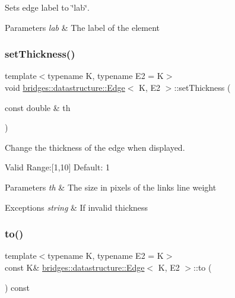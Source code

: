 Sets edge label to \char`\"{}lab\char`\"{}. 


\begin{DoxyParams}{Parameters}
{\em lab} & The label of the element \\
\hline
\end{DoxyParams}
\mbox{\label{classbridges_1_1datastructure_1_1_edge_adf4a6a3974e1fc60331f4b9d33c7b0e5}} 
\subsubsection{\texorpdfstring{set\+Thickness()}{setThickness()}}
{\footnotesize\ttfamily template$<$typename K, typename E2 = K$>$ \\
void \hyperlink{classbridges_1_1datastructure_1_1_edge}{bridges\+::datastructure\+::\+Edge}$<$ K, E2 $>$\+::set\+Thickness (\begin{DoxyParamCaption}\item[{const double \&}]{th }\end{DoxyParamCaption})\hspace{0.3cm}{\ttfamily [inline]}}



Change the thickness of the edge when displayed. 

Valid Range\+:\mbox{[}1,10\mbox{]} Default\+: 1


\begin{DoxyParams}{Parameters}
{\em th} & The size in pixels of the link\textquotesingle{}s line weight \\
\hline
\end{DoxyParams}

\begin{DoxyExceptions}{Exceptions}
{\em string} & If invalid thickness \\
\hline
\end{DoxyExceptions}
\mbox{\label{classbridges_1_1datastructure_1_1_edge_a2cece2762a29e3fc18859e0c725eee82}} 
\subsubsection{\texorpdfstring{to()}{to()}}
{\footnotesize\ttfamily template$<$typename K, typename E2 = K$>$ \\
const K\& \hyperlink{classbridges_1_1datastructure_1_1_edge}{bridges\+::datastructure\+::\+Edge}$<$ K, E2 $>$\+::to (\begin{DoxyParamCaption}{ }\end{DoxyParamCaption}) const\hspace{0.3cm}{\ttfamily [inline]}}



